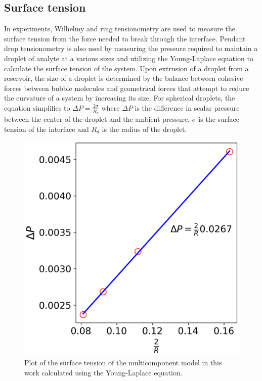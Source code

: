 \subsection{Surface tension}
\label{section:model_surface_tension}

In experiments, Wilhelmy and ring tensionometry are used to measure the surface tension from the force needed 
to break through the interface. Pendant drop tensionometry is also used by measuring the pressure required to 
maintain a droplet of analyte at a various sizes and utilizing the Young-Laplace equation to calculate the 
surface tension of the system. \cite{sun_assembly_2013, berry_measurement_2015}
Upon extrusion of a droplet from a reservoir, the size of a droplet is determined by the balance between 
cohesive forces between bubble molecules and geometrical forces that attempt to reduce the curvature of a 
system by increasing its size. For spherical droplets, the equation simplifies to 
$\Delta P = \frac{2 \sigma}{R_d}$ where $\Delta P$ is the difference in scalar pressure 
between the center of the droplet and the ambient pressure, $\sigma$ is the surface tension 
of the interface and $R_d$ is the radius of the droplet. 

\begin{figure}[h]
    \centering
    \includegraphics[scale = 0.5]{figures/model_validation/surface_tension.png}
    \caption{Plot of the surface tension of the multicomponent model in this work calculated using the 
    Young-Laplace equation.}
    \label{fig:young_laplace_valid}
\end{figure}

